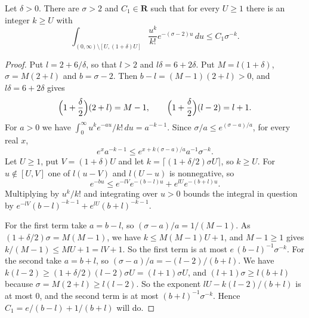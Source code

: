 \begin{lemma}\label{wl-kernel-tails}
Let $\delta>0$. There are $\sigma>2$ and $C_1\in\mathbf R$ such that for every
$U\geq1$ there is an integer $k\geq U$ with
\[
 \int_{(0,\infty)\setminus[U,(1+\delta)U]}\frac{u^k}{k!}e^{-(\sigma-2)u}\,du
 \leq C_1\sigma^{-k}.
\]
\end{lemma}
\begin{proof}
Put $l=2+6/\delta$, so that $l>2$ and $l\delta=6+2\delta$. Put
$M=l(1+\delta)$, $\sigma=M(2+l)$ and $b=\sigma-2$. Then
$b-l=(M-1)(2+l)>0$, and $l\delta=6+2\delta$ gives
\[
 \Bigl(1+\frac\delta2\Bigr)(2+l)=M-1,\qquad
 \Bigl(1+\frac\delta2\Bigr)(l-2)=l+1.
\]
For $a>0$ we have $\int_0^\infty u^ke^{-au}/k!\,du=a^{-k-1}$. Since
$\sigma/a\leq e^{(\sigma-a)/a}$, for every real $x$,
\[
 e^xa^{-k-1}\leq e^{x+k(\sigma-a)/a}a^{-1}\sigma^{-k}.
\]
Let $U\geq1$, put $V=(1+\delta)U$ and let $k=\lceil(1+\delta/2)\sigma U\rceil$,
so $k\geq U$. For $u\notin[U,V]$ one of $l(u-V)$ and $l(U-u)$ is nonnegative,
so
\[
 e^{-bu}\leq e^{-lV}e^{-(b-l)u}+e^{lU}e^{-(b+l)u}.
\]
Multiplying by $u^k/k!$ and integrating over $u>0$ bounds the integral in
question by $e^{-lV}(b-l)^{-k-1}+e^{lU}(b+l)^{-k-1}$.

For the first term take $a=b-l$, so $(\sigma-a)/a=1/(M-1)$. As
$(1+\delta/2)\sigma=M(M-1)$, we have $k\leq M(M-1)U+1$, and $M-1\geq1$ gives
$k/(M-1)\leq MU+1=lV+1$. So the first term is at most $e\,(b-l)^{-1}\sigma^{-k}$.
For the second take $a=b+l$, so $(\sigma-a)/a=-(l-2)/(b+l)$. We have
$k(l-2)\geq(1+\delta/2)(l-2)\sigma U=(l+1)\sigma U$, and
$(l+1)\sigma\geq l(b+l)$ because $\sigma=M(2+l)\geq l(l-2)$. So the exponent
$lU-k(l-2)/(b+l)$ is at most $0$, and the second term is at most
$(b+l)^{-1}\sigma^{-k}$. Hence $C_1=e/(b-l)+1/(b+l)$ will do.
\end{proof}

